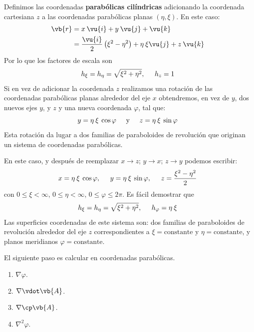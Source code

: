Definimos las coordenadas \textbf{parabólicas cilíndricas} adicionando la coordenada cartesiana $z$ a las coordenadas parabólicas planas $(\eta, \xi)$. En este caso:
\begin{align*}
\vb{r} &= x \: \vu{i} + y \: \vu{j} + \vu{k} \\
&= \dfrac{\vu{i}}{2} \left( \xi^{2} - \eta^{2} \right) + \eta \: \xi \vu{j} + z \: \vu{k}
\end{align*}
Por lo que los factores de escala son
\[ h_{\xi} = h_{\eta} = \sqrt{\xi^{2} + \eta^{2}}, \hspace{0.5cm} h_{z} = 1 \]
Si en vez de adicionar la coordenada $z$ realizamos una rotación de las coordenadas parabólicas planas alrededor del eje $x$ obtendremos, en vez de $y$, dos nuevos ejes $y$, y $z$ y una nueva coordenada $\varphi$, tal que: 
\[ y = \eta \: \xi \: \cos \varphi \hspace{0.5cm} \mbox{y} \hspace{0.5cm} z= \eta \: \xi \: \sin \varphi\]
Esta rotación da lugar a dos familias de paraboloides de revolución que originan un sistema de coordenadas parabólicas.
\par
En este caso, y después de reemplazar $x \to z$; $y \to x$; $z \to y$ podemos escribir:
\[ x = \eta \: \xi \: \cos \varphi, \hspace{0.5cm} y = \eta \: \xi \: \sin \varphi, \hspace{0.5cm} z = \dfrac{\xi^{2} -\eta^{2}}{2} \]
con $0 \leq \xi < \infty$, $0 \leq \eta < \infty$, $0 \leq \varphi \leq 2 \pi$. Es fácil demostrar que
\[ h_{\xi} = h_{\eta} = \sqrt{\xi^{2} + \eta^{2}}, \hspace{0.5cm} h_{\varphi} = \eta \: \xi \]
Las superficies coordenadas de este sistema son: dos familias de paraboloides de revolución alrededor del eje $z$ correspondientes a $\xi = \mbox{constante}$ y $\eta = \mbox{constante}$, y planos meridianos $\varphi = \mbox{constante}$.
\par
El siguiente paso es calcular en coordenadas parabólicas.
\begin{enumerate}
\item $\nabla \varphi$.
\item $\nabla \vdot \vb{A}$.
\item $\nabla \cp \vb{A}$.
\item $\nabla^{2} \varphi$.
\end{enumerate}
